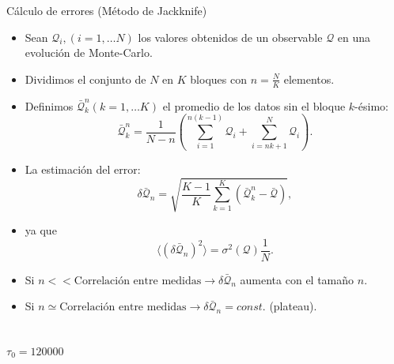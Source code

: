 \documentclass[xcolor=dvipsnames]{beamer}
\begin{document}
\begin{frame}{Cálculo de errores (Método de Jackknife)}
  \begin{itemize}
  \item Sean $\mathcal{Q}_i,(i=1,\dots N)$ los valores obtenidos de un
    observable $\mathcal{Q}$ en una evolución de Monte-Carlo. 
  \item Dividimos el conjunto de $N$ en $K$ bloques con $n=\frac{N}{K}$
    elementos.
  \item Definimos $\bar{\mathcal{Q}}_k^n(k=1,\dots K)$ el promedio de los
    datos sin el bloque $k$-ésimo:
    $$\bar{\mathcal{Q}}_k^n=\frac{1}{N-n}\left(\sum^{n(k-1)}_{i=1}\mathcal{Q}_i+\sum^{N}_{i=nk+1}\mathcal{Q}_i\right).$$
\item La estimación del error:
$$\delta\bar{\mathcal{Q}}_n=\sqrt{\frac{K-1}{K}\sum^K_{k=1}(\bar{\mathcal{Q}}^n_k-\bar{\mathcal{Q}})},$$
\item ya que
  $$ \langle (\delta\bar{\mathcal{Q}}_n)^2\rangle=\sigma^2(\mathcal{Q})\frac{1}{N}.$$
\end{itemize}
\end{frame}

\begin{frame}
\begin{itemize}
\item Si $n<<\text{Correlación entre medidas}\rightarrow
  \delta\bar{\mathcal{Q}}_n$ aumenta con el tamaño $n$.
\item Si $n\simeq \text{Correlación entre
    medidas}\rightarrow\delta\bar{\mathcal{Q}}_n=const.$ (plateau).
\end{itemize}
\begin{columns}
  \begin{column}{6cm}
    \begin{figure}
      \resizebox{\columnwidth}{!}{}
    \end{figure}
  \end{column}
  \begin{column}{6cm}
     \begin{figure}
       \resizebox{\columnwidth}{!}{}
    \end{figure}
  \end{column}
\end{columns}
\begin{center}
$\tau_0=120000$
\end{center}
\end{frame}
\end{document}
